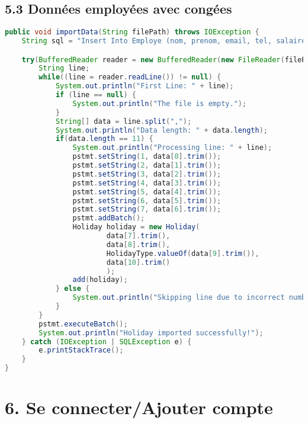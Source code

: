 \documentclass[a4paper,12pt]{report}
\begin{document}
\subsection{\textcolor{mygreen}{5.3 Données employées avec congées}}
\begin{lstlisting}[language=java, caption={La methode pour importer les données des employées aves ses congées}]
public void importData(String filePath) throws IOException {
    String sql = "Insert Into Employe (nom, prenom, email, tel, salaire, Poste, Role ) values (?,?,?,?,?,?,?)";

    try(BufferedReader reader = new BufferedReader(new FileReader(filePath)); PreparedStatement pstmt = conn.prepareStatement(sql)) {
        String line;		    
        while((line = reader.readLine()) != null) {
            System.out.println("First Line: " + line);
            if (line == null) {
                System.out.println("The file is empty.");
            }
            String[] data = line.split(",");
            System.out.println("Data length: " + data.length); 
            if(data.length == 11) {
                System.out.println("Processing line: " + line);
                pstmt.setString(1, data[0].trim());
                pstmt.setString(2, data[1].trim());
                pstmt.setString(3, data[2].trim());
                pstmt.setString(4, data[3].trim());
                pstmt.setString(5, data[4].trim());
                pstmt.setString(6, data[5].trim());
                pstmt.setString(7, data[6].trim());
                pstmt.addBatch();
                Holiday holiday = new Holiday(
                        data[7].trim(),
                        data[8].trim(),
                        HolidayType.valueOf(data[9].trim()),
                        data[10].trim()
                        );
                add(holiday);
            } else {
                System.out.println("Skipping line due to incorrect number of data fields");
            }
        }
        pstmt.executeBatch();
        System.out.println("Holiday imported successfully!");            
    } catch (IOException | SQLException e) {
        e.printStackTrace();    
    }		
}
\end{lstlisting}
\newpage

\section*{\textcolor{myblue}{6. Se connecter/Ajouter compte}}
\end{document}
